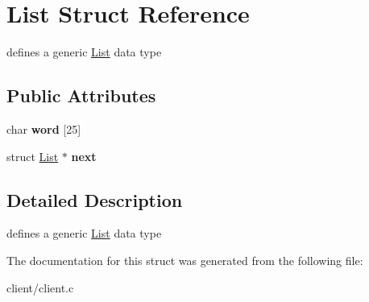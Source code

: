 \hypertarget{structList}{\section{List Struct Reference}
\label{structList}
}


defines a generic \hyperlink{structList}{List} data type  


\subsection*{Public Attributes}
\begin{DoxyCompactItemize}
\item 
\hypertarget{structList_a01508f1f9eced93d09abef31db5692aa}{char {\bfseries word} \mbox{[}25\mbox{]}}\label{structList_a01508f1f9eced93d09abef31db5692aa}

\item 
\hypertarget{structList_aa395a364263b11a52818d9ab2d1ad768}{struct \hyperlink{structList}{List} $\ast$ {\bfseries next}}\label{structList_aa395a364263b11a52818d9ab2d1ad768}

\end{DoxyCompactItemize}


\subsection{Detailed Description}
defines a generic \hyperlink{structList}{List} data type 

The documentation for this struct was generated from the following file\-:\begin{DoxyCompactItemize}
\item 
client/client.\-c\end{DoxyCompactItemize}
